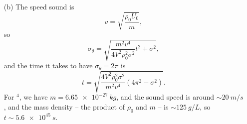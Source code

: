 \documentclass[hyperref, a4paper]{article}
\begin{document}
\begin{itemize}
\item[(b)] The speed sound is 
\begin{equation}
    v = \sqrt{\frac{\rho_0 U_0}{m}},
\end{equation}
so 
\begin{equation}
    \sigma_\theta  = \sqrt{ \frac{m^2 v^4}{4 V^2 \rho_0^2 \sigma^2} t^2 + \sigma^2 },
\end{equation}
and the time it takes to have $\sigma_\theta = 2 \pi$ is 
\begin{equation}
    t = \sqrt{ \frac{4 V^2 \rho_0^2 \sigma^2}{m^2 v^4} (4\pi^2 - \sigma^2 )}.
\end{equation} 
For $^4$, we have $m = \SI{6.65e-27}{kg}$,
and the sound speed is around $\sim \SI{20}{m/s}$ \cite{PhysRev.71.600},
and the mass density -- the product of $\rho_0$ and $m$ -- is $\sim \SI{125}{g/L}$,
so $t \sim \SI{5.6e45}{s}$.


\end{itemize}
\end{document}
